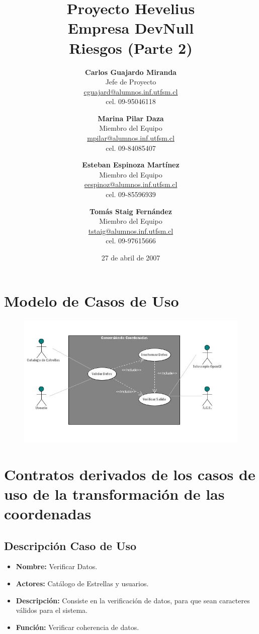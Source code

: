 \documentclass[letterpaper,spanish,10pt]{article}
\title{{\Huge \bf Proyecto Hevelius} \\ {\Large Empresa DevNull} \\ {\small Riesgos (Parte 2)}}
\author{
{\bf Carlos Guajardo Miranda} \\ Jefe de Proyecto \\ \url{cguajard@alumnos.inf.utfsm.cl} \\ cel. 09-95046118 
\and
{\bf Marina Pilar Daza} \\ Miembro del Equipo \\ \url{mpilar@alumnos.inf.utfsm.cl} \\ cel. 09-84085407
\and
{\bf Esteban Espinoza Mart\'inez} \\ Miembro del Equipo \\ \url{eespinoz@alumnos.inf.utfsm.cl} \\ cel. 09-85596939
\and
{\bf Tom\'as Staig Fern\'andez} \\ Miembro del Equipo \\ \url{tstaig@alumnos.inf.utfsm.cl} \\ cel. 09-97615666
}
\date{27 de abril de 2007}
\begin{document}
\maketitle


%
%
\newpage



\section{Modelo de Casos de Uso}

\begin{figure}[h]
  \centering
    \includegraphics[width=7in]{modelo}
\end{figure}



\section{Contratos derivados de los casos de uso de la transformaci\'on de las coordenadas}

\subsection{Descripci\'on Caso de Uso}

\begin{itemize}
\item \textbf{Nombre:} Verificar Datos.
\item \textbf{Actores:} Cat\'alogo de Estrellas y usuarios.
\item \textbf{Descripci\'on:} Consiste en la verificaci\'on de datos, para que sean caracteres v\'alidos para el sistema.
\item \textbf{Funci\'on:} Verificar coherencia de datos.
\end{itemize}
\end{document}
